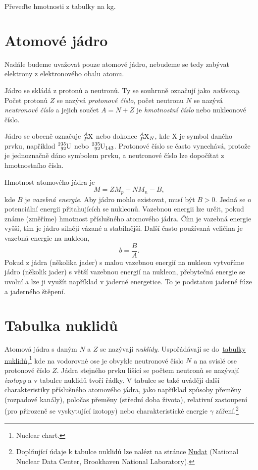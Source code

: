 \documentclass[a4paper,12pt,oneside]{article}
\theoremstyle{red}
\begin{document}
\begin{task}
    Převeďte hmotnosti z tabulky na kg.
\end{task}

\section{Atomové jádro}
    Nadále budeme uvažovat pouze atomové jádro, nebudeme se tedy zabývat elektrony z elektronového obalu atomu.

    Jádro se skládá z protonů a neutronů. Ty se souhrnně označují jako \emph{nukleony}.
    Počet protonů $Z$ se nazývá \emph{protonové číslo},
    počet neutronu $N$ se nazývá \emph{neutronové číslo}
    a jejich součet $A=N+Z$ je \emph{hmotnostní číslo} nebo nukleonové číslo.

    Jádro se obecně označuje $\ce{^{\it A}_{\it P}X}$ nebo dokonce $\ce{^{\it A}_{\it P}X_{\it N}}$, kde X je symbol daného prvku, například $\ce{^{235}_{92}U}$ nebo $\ce{^{235}_{92}U_{143}}$.
    Protonové číslo se často vynechává, protože je jednoznačně dáno symbolem prvku, a neutronové číslo lze dopočítat z hmotnostního čísla.

    Hmotnost atomového jádra je
    \begin{equation}
        M=ZM_{p}+NM_{n}-B,
    \end{equation}
    kde $B$ je \emph{vazebná energie}.
    Aby jádro mohlo existovat, musí být $B>0$.
    Jedná se o potenciální energii přitahujících se nukleonů.
    Vazebnou energii lze určit, pokud známe (změříme) hmotnost příslušného atomového jádra.
    Čím je vazebná energie vyšší, tím je jádro silněji vázané a stabilnější.
    Další často používaná veličina je vazebná energie na nukleon,
    \begin{equation}
        b=\frac{B}{A}.
    \end{equation}
    Pokud z jádra (několika jader) s malou vazebnou energií na nukleon vytvoříme jádro (několik jader) s větší vazebnou energií na nukleon, přebytečná energie se uvolní a lze ji využít například v jaderné energetice.
    To je podstatou jaderné fúze a jaderného štěpení.

\section{Tabulka nuklidů}
    Atomová jádra s daným $N$ a $Z$ se nazývají \emph{nuklidy}.
    Uspořádávají se do~\href{https://upload.wikimedia.org/wikipedia/commons/b/b5/NuclideMap_stitched.png}{tabulky nuklidů},\footnote{Nuclear chart.} kde na vodorovné ose je obvykle neutronové číslo $N$ a na svislé ose protonové číslo $Z$.
    Jádra stejného prvku lišící se počtem neutronů se nazývají \emph{izotopy} a v tabulce nuklidů tvoří řádky.
    V tabulce se také uvádějí další charakteristiky příslušného atomového jádra, jako například způsoby přeměny (rozpadové kanály), poločas přeměny (střední doba života), relativní zastoupení (pro přirozeně se vyskytující izotopy) nebo charakteristické energie $\gamma$ záření.\footnote{
        Doplňující údaje k tabulce nuklidů lze nalézt na stránce \href{https://www.nndc.bnl.gov/nudat3/}{Nudat} (National Nuclear Data Center, Brookhaven National Laboratory).
    }
\end{document}
